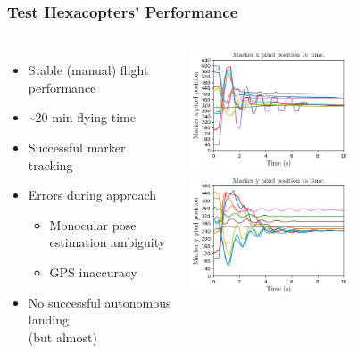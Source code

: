 \documentclass[aspectratio=169]{rubeamer}
\begin{document}
\begin{frame}
  \frametitle{Test Hexacopters' Performance}
  \begin{columns}
    \begin{itemize}
      \item Stable (manual) flight performance
      \item \textasciitilde 20 min flying time
      \item Successful marker tracking
      \item Errors during approach
      \begin{itemize}
        \item Monocular pose estimation ambiguity
        \item GPS inaccuracy
      \end{itemize}
      \item No successful autonomous landing\\(but almost)
    \end{itemize}
    \centering
    \includegraphics[width=0.6\textwidth]{coral_gimbal_performance_x_axis}\\
    \includegraphics[width=0.6\textwidth]{coral_gimbal_performance_y_axis}\\
  \end{columns}
\end{frame}
\end{document}
